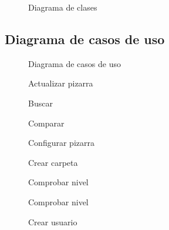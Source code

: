 {\color{red}{\huge PROVISIONAL}}

\begin{landscape}
\begin{figure}[!h]
\centering
\clases
\caption{Diagrama de clases}
\end{figure}
\end{landscape}

\subsection{Diagrama de casos de uso}

\begin{landscape}
\begin{figure}[!h]
\centering
\casos
\caption{Diagrama de casos de uso}
\end{figure}
\end{landscape}

\begin{figure}[!h]
\centering
\actualizarPizarra
\caption{Actualizar pizarra}
\end{figure}
\newpage

\begin{figure}[!h]
\centering
\buscar
\caption{Buscar}
\end{figure}
\newpage

\begin{figure}[!h]
\centering
\comparar
\caption{Comparar}
\end{figure}
\newpage

\begin{figure}[!h]
\centering
\configurarPizarra
\caption{Configurar pizarra}
\end{figure}
\newpage

\begin{figure}[!h]
\centering
\crearCarpeta
\caption{Crear carpeta}
\end{figure}
\newpage

\begin{figure}[!h]
\centering
\comprobarNivel
\caption{Comprobar nivel}
\end{figure}
\newpage

\begin{figure}[!h]
\centering
\comprobarNivel
\caption{Comprobar nivel}
\end{figure}
\newpage

\begin{figure}[!h]
\centering
\crearUsuario
\caption{Crear usuario}
\end{figure}
\newpage

